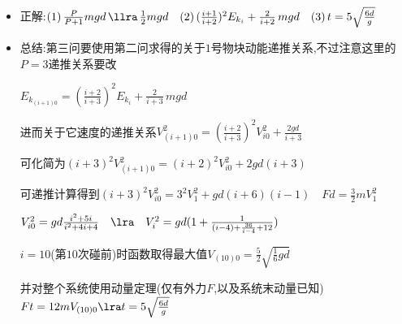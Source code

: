 \documentclass{article}
\begin{document}
\begin{itemize}
    \item 正解:\quad $(1) \, \frac{P}{P+1}mgd \, \llra \, \frac{1}{2}mgd \quad (2) \,
    (\frac{i+1}{i+2})^{2} E_{k_{i}} + \frac{2}{i+2} \, mgd \quad (3) \, t = 5 \sqrt{\frac{6d}{g}} $
    \item 总结:第三问要使用第二问求得的关于$1$号物块动能递推关系,不过注意这里的$P=3$递推关系要改
    
    \hspace{3.2em}$E_{k_{(i+1)0}} = (\frac{i+2}{i+3})^{2} E_{k_{i}} + \frac{2}{i+3} \, mgd$

    \hspace{3.2em}进而关于它速度的递推关系$V_{(i+1)0}^{2} = (\frac{i+2}{i+3})^{2} V_{i0}^{2} + \frac{2gd}{i+3}$

    \hspace{3.2em}可化简为$(i+3)^{2} V_{(i+1)0}^{2} = (i+2)^{2} V_{i0}^{2} + 2gd(i+3)$

    \hspace{3.2em}可递推计算得到$(i+3)^{2}V_{i0}^{2} = 3^{2} V_{1}^{2} + gd(i+6)(i-1) \quad Fd = \frac{3}{2} mV_{1}^{2}$

    \hspace{3.2em}$V_{i0}^{2} = gd \frac{i^{2} + 5i}{i^{2} + 4i + 4} \quad \lra \quad V_{i}^{2} = gd(1 + \frac{1}{(i-4)+\frac{36}{i-4} + 12})$

    \hspace{3.2em}$i = 10$(第$10$次碰前)时函数取得最大值$V_{(10)0} = \frac{5}{2}\sqrt{\frac{1}{6}gd}$
    
    \hspace{3.2em}并对整个系统使用动量定理(仅有外力$F$,以及系统末动量已知)$Ft = 12mV_{(10)0} \lra t= 5\sqrt{\frac{6d}{g}}$
\end{itemize}
\end{document}
